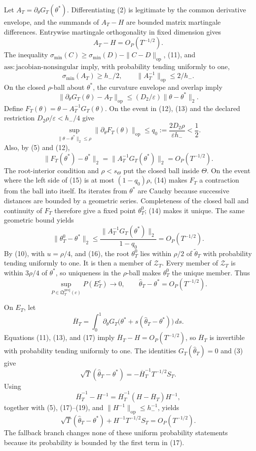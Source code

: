 Let \(A_T=\partial_\theta G_T(\theta^*)\). Differentiating (2) is legitimate by the common derivative envelope, and the summands of \(A_T-H\) are bounded matrix martingale differences. Entrywise martingale orthogonality in fixed dimension gives
\[
 A_T-H=O_P(T^{-1/2}).
\tag{11}
\]
The inequality \(\sigma_{\min}(C)\ge\sigma_{\min}(D)-\|C-D\|_{\mathrm{op}}\), (11), and \(\mathrm{ass:jacobian\text{-}nonsingular}\) imply, with probability tending uniformly to one,
\[
 \sigma_{\min}(A_T)\ge h_-/2,
 \qquad \|A_T^{-1}\|_{\mathrm{op}}\le2/h_-.
\tag{12}
\]
On the closed \(\rho\)-ball about \(\theta^*\), the curvature envelope and overlap imply
\[
 \|\partial_\theta G_T(\theta)-A_T\|_{\mathrm{op}}
 \le(D_2/\varepsilon)\|\theta-\theta^*\|_2.
\tag{13}
\]
Define \(F_T(\theta)=\theta-A_T^{-1}G_T(\theta)\). On the event in (12), (13) and the declared restriction \(D_2\rho/\varepsilon<h_-/4\) give
\[
 \sup_{\|\theta-\theta^*\|_2\le\rho}
 \|\partial_\theta F_T(\theta)\|_{\mathrm{op}}
 \le q_0:=\frac{2D_2\rho}{\varepsilon h_-}<\frac12.
\tag{14}
\]
Also, by (5) and (12),
\[
 \|F_T(\theta^*)-\theta^*\|_2
 =\|A_T^{-1}G_T(\theta^*)\|_2=O_P(T^{-1/2}).
\tag{15}
\]
The root-interior condition and \(\rho<s_\Theta\) put the closed ball inside \(\Theta\). On the event where the left side of (15) is at most \((1-q_0)\rho\), (14) makes \(F_T\) a contraction from the ball into itself. Its iterates from \(\theta^*\) are Cauchy because successive distances are bounded by a geometric series. Completeness of the closed ball and continuity of \(F_T\) therefore give a fixed point \(\theta_T^0\); (14) makes it unique. The same geometric bound yields
\[
 \|\theta_T^0-\theta^*\|_2
 \le\frac{\|A_T^{-1}G_T(\theta^*)\|_2}{1-q_0}
 =O_P(T^{-1/2}).
\tag{16}
\]
By (10), with \(u=\rho/4\), and (16), the root \(\theta_T^0\) lies within \(\rho/2\) of \(\widetilde\theta_T\) with probability tending uniformly to one. It is then a member of \(\mathcal Z_T\). Every member of \(\mathcal Z_T\) is within \(3\rho/4\) of \(\theta^*\), so uniqueness in the \(\rho\)-ball makes \(\theta_T^0\) the unique member. Thus
\[
 \sup_{P\in\mathfrak Q_T^{\mathrm{proj}}(c)}P(E_T^c)\longrightarrow0,
 \qquad \widehat\theta_T-\theta^*=O_P(T^{-1/2}).
\tag{17}
\]

On \(E_T\), let
\[
 \overline H_T=\int_0^1\partial_\theta G_T
 \bigl(\theta^*+s(\widehat\theta_T-\theta^*)\bigr)\,ds.
\tag{18}
\]
Equations (11), (13), and (17) imply \(\overline H_T-H=O_P(T^{-1/2})\), so \(\overline H_T\) is invertible with probability tending uniformly to one. The identities \(G_T(\widehat\theta_T)=0\) and (3) give
\[
 \sqrt T(\widehat\theta_T-\theta^*)
 =-\overline H_T^{-1}T^{-1/2}S_T.
\tag{19}
\]
Using
\[
 \overline H_T^{-1}-H^{-1}
 =\overline H_T^{-1}(H-\overline H_T)H^{-1},
\tag{20}
\]
together with (5), (17)--(19), and \(\|H^{-1}\|_{\mathrm{op}}\le h_-^{-1}\), yields
\[
 \sqrt T(\widehat\theta_T-\theta^*)+H^{-1}T^{-1/2}S_T
 =O_P(T^{-1/2}).
\tag{21}
\]
The fallback branch changes none of these uniform probability statements because its probability is bounded by the first term in (17).

